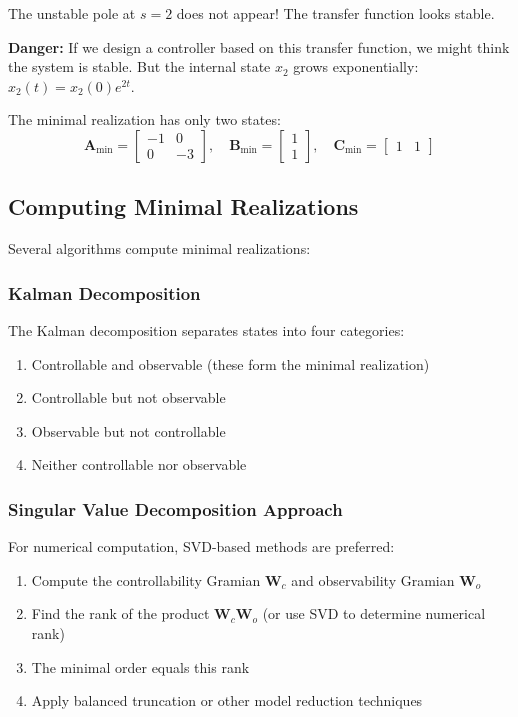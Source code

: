 \begin{example}
The unstable pole at $s = 2$ does not appear! The transfer function looks stable.

\textbf{Danger:} If we design a controller based on this transfer function, we might think the system is stable. But the internal state $x_2$ grows exponentially: $x_2(t) = x_2(0)e^{2t}$.

The minimal realization has only two states:
\begin{equation}
\mathbf{A}_{\min} = \begin{bmatrix} -1 & 0 \\ 0 & -3 \end{bmatrix}, \quad
\mathbf{B}_{\min} = \begin{bmatrix} 1 \\ 1 \end{bmatrix}, \quad
\mathbf{C}_{\min} = \begin{bmatrix} 1 & 1 \end{bmatrix}
\end{equation}
\end{example}

\subsection{Computing Minimal Realizations}

Several algorithms compute minimal realizations:

\subsubsection{Kalman Decomposition}

The Kalman decomposition separates states into four categories:
\begin{enumerate}
\item Controllable and observable (these form the minimal realization)
\item Controllable but not observable
\item Observable but not controllable
\item Neither controllable nor observable
\end{enumerate}

\subsubsection{Singular Value Decomposition Approach}

For numerical computation, SVD-based methods are preferred:
\begin{enumerate}
\item Compute the controllability Gramian $\mathbf{W}_c$ and observability Gramian $\mathbf{W}_o$
\item Find the rank of the product $\mathbf{W}_c\mathbf{W}_o$ (or use SVD to determine numerical rank)
\item The minimal order equals this rank
\item Apply balanced truncation or other model reduction techniques
\end{enumerate}


